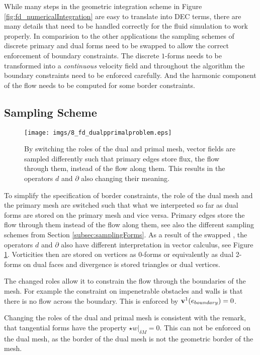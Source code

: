 While many steps in the geometric integration scheme in Figure \ref{fig:fd_numericalIntegration} are easy to translate into DEC terms, there are many details that need to be handled correctly for the fluid simulation to work properly. In comparision to the other applications the sampling schemes of discrete primary and dual forms need to be swapped to allow the correct enforcement of boundary constraints. The discrete $1$-forms needs to be transformed into a \emph{continuous} velocity field and throughout the algorithm the boundary constraints need to be enforced carefully. And the harmonic component of the flow needs to be computed for some border constraints.

\subsection{Sampling Scheme}

\begin{figure}%
\texttt{[image: imgs/8\_fd\_dualpprimalproblem.eps]}%
\caption{By switching the roles of the dual and primal mesh, vector fields are sampled differently such that primary edges store flux, the flow through them, instead of the flow along them. This results in the operators $d$ and $\partial$ also changing their meaning.}%
\label{fig:fd_whoiswho}%
\end{figure}

To simplify the specification of border constraints, the role of the dual mesh and the primary mesh are switched such that what we interpreted so far as dual forms are stored on the primary mesh and vice versa.  Primary edges store the flow through them instead of the flow along them, see also the different sampling schemes from Section \ref{subsec:samplingForms}. As a result of the swapped , the operators $d$ and $\partial$ also have  different interpretation in vector calculus, see Figure \ref{fig:fd_whoiswho}. Vorticities then are stored on vertices as $0$-forms or equivalently as dual 2-forms on dual faces and divergence is stored triangles or dual vertices.

The changed roles allow it to constrain the flow through the boundaries of the mesh. For example the constraint on impenetrable obstacles and walls is that there is no flow across the boundary. This is enforced by $\textbf{v}^1(e_{boundary}) = 0$.

Changing the roles of the dual and primal mesh is consistent with the remark, that tangential forms have the property $\star w |_{\delta M} = 0 $. This can not be enforced on the dual mesh, as the border of the dual mesh is not the geometric border of the mesh. %

